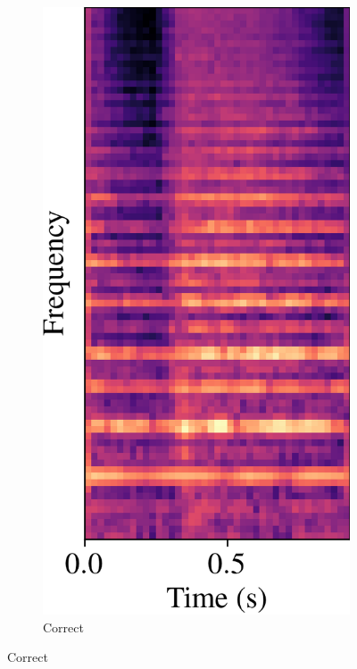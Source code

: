 \documentclass[conference]{IEEEtran}
\begin{document}
\begin{figure}[htbp]
    \centering
    \begin{subfigure}[b]{0.32\columnwidth}
        \centerline{\includegraphics[width=\columnwidth]{spec_correct.png}}
        \caption{Correct}
        \label{spec_correct}

\end{subfigure}
\end{figure}
\end{document}
